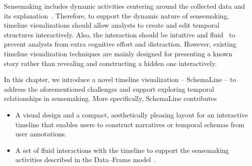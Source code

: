 Sensemaking includes dynamic activities centering around the collected data and its explanation~\cite{Klein2003}. Therefore, to support the dynamic nature of sensemaking, timeline visualizations should allow analysts to create and edit temporal structures interactively. Also, the interaction should be intuitive and fluid~\cite{Elmqvist2011} to prevent analysts from extra cognitive effort and distraction. However, existing timeline visualization techniques are mainly designed for presenting a known story rather than revealing and constructing a hidden one interactively.

\pagebreak
In this chapter, we introduce a novel timeline visualization -- SchemaLine -- to address the aforementioned challenges and support exploring temporal relationships in sensemaking. More specifically, SchemaLine contributes
\begin{itemize}
	\item A visual design and a compact, aesthetically pleasing layout for an interactive timeline that enables users to construct narratives or temporal schemas from user annotations.
	\item A set of fluid interactions with the timeline to support the sensemaking activities described in the Data--Frame model~\cite{Klein2003}.
\end{itemize}